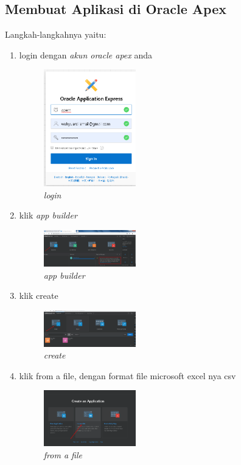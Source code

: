 \documentclass{article}
\begin{document}
\newpage

\subsection{Membuat Aplikasi di Oracle Apex}
\par Langkah-langkahnya yaitu:
\begin{enumerate}
\item login dengan \textit{akun oracle apex} anda
    \begin{figure}[ht]
        \centerline{\includegraphics[width=4cm]{l.png}}
        \caption{\textit{login}}
    \end{figure}
    
\item klik \textit{app builder} 
     \begin{figure}[ht]
        \centerline{\includegraphics[width=4cm]{m.png}}
        \caption{\textit{app builder}}
    \end{figure}

\item klik create
     \begin{figure}[ht]
        \centerline{\includegraphics[width=4cm]{n.png}}
        \caption{\textit{create}}
    \end{figure}
    
\newpage

\item klik from a file, dengan format file microsoft excel nya csv
     \begin{figure}[ht]
        \centerline{\includegraphics[width=4cm]{o.png}}
        \caption{\textit{from a file}}
    \end{figure}
    

\end{enumerate}
\end{document}
